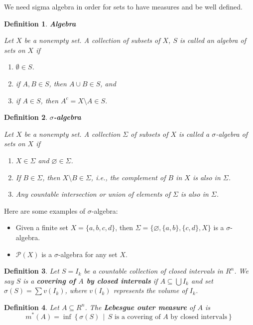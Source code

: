\documentclass[12pt]{amsart}
\newtheorem{definition}{Definition}
\theoremstyle{plain}
\theoremstyle{definition}
\theoremstyle{remark}
\numberwithin{equation}{section}
\numberwithin{thm}{section}
\begin{document}
We need sigma algebra in order for sets to have measures and be well defined.

\begin{definition}
\textbf{Algebra}

Let $X$ be a nonempty set. A collection of subsets of $X$, $S$ is called an algebra of sets on $X$ if 
\begin{enumerate}
    \item $\emptyset \in S$.
    \item if $A,B \in S$, then $A \cup B \in S$, and
    \item if $A \in S$, then $A^c = X \setminus A \in S$.
\end{enumerate}
\end{definition}

\begin{definition}
\textbf{$\sigma$-algebra}

Let $X$ be a nonempty set. A collection $\Sigma$ of subsets of $X$ is called a $\sigma$-algebra of sets on $X$ if 
\begin{enumerate}
    \item [(i)] $X \in \Sigma$ and $\varnothing \in \Sigma$.
    \item [(ii)] If $B \in \Sigma$, then $X \setminus B \in \Sigma$, i.e., the complement of $B$ in $X$ is also in $\Sigma$.
    \item [(iii)] Any countable intersection or union of elements of $\Sigma$ is also in $\Sigma$.
\end{enumerate}
\end{definition}

 Here are some examples of $\sigma$-algebra:
 \begin{itemize}
    \item Given a finite set $X = \{a, b, c, d\}$, then $\Sigma = \{\varnothing, \{a, b\}, \{c,d\}, X\}$ is a $\sigma$-algebra.
    \item $\mathcal{P}(X)$ is a $\sigma$-algebra for any set $X$.
\end{itemize}
\iffalse
\begin{definition}
    Let $S={I_k}$ be a countable collection of closed intervals in $R^n$. We say $S$ is a \textbf{covering of $A$ by closed intervals} if $A \subseteq \bigcup I_k$ and set $\sigma (S) = \sum v(I_k)$, where $v(I_k)$ represents the volume of $I_k$.
\end{definition}
  
\begin{definition}
Let $A \subseteq R^n$. The \textbf{Lebesgue outer measure} of $A$ is 
\begin{equation*}
m^*(A) = \inf \left\{\sigma(S) \, \middle| \, S \text{ is a covering of } A \text{ by closed intervals} \right\}
\end{equation*}
\end{definition}
\end{document}
